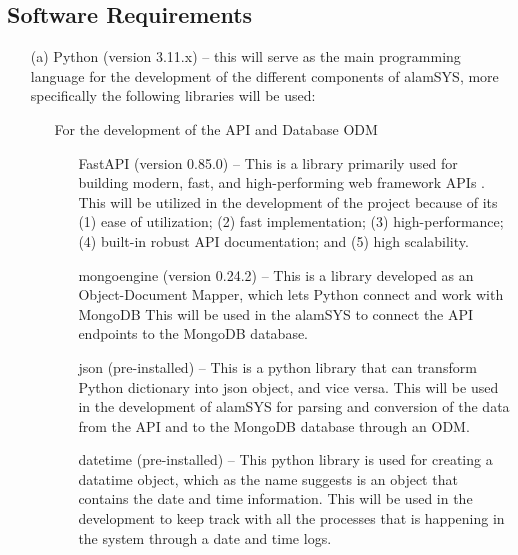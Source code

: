 \subsection{Software Requirements}
\label{sec:software_requirements}
\begin{itemize}
    \item[(a)] Python (version 3.11.x) – this will serve as the main programming 
    language for the development of the different components of alamSYS, more 
    specifically the following libraries will be used:
        \begin{itemize}
            \item[\ding{108}] For the development of the API and Database ODM
                \begin{itemize}
                    \item[\ding{109}] FastAPI (version 0.85.0) – This is a library primarily 
                    used for building modern, fast, and high-performing web framework APIs 
                    \cite{Tiangolo}.
                    This will be utilized in the development of the project because of its 
                    (1) ease of utilization; 
                    (2) fast implementation; 
                    (3) high-performance; 
                    (4) built-in robust API documentation; and 
                    (5) high scalability.
                    \item[\ding{109}] mongoengine (version 0.24.2) – This is a library developed 
                    as an Object-Document Mapper, which lets Python connect and work with MongoDB 
                    \cite{MongoEngine}
                    This will be used in the alamSYS to connect the API endpoints to the 
                    MongoDB database.
                    \item[\ding{109}] json (pre-installed) – This is a python library that 
                    can transform Python dictionary into json object, and vice versa. 
                    This will be used in the development of alamSYS for parsing and conversion of 
                    the data from the API and to the MongoDB database through an ODM.
                    \item[\ding{109}] datetime (pre-installed) – This python library is used for creating 
                    a datatime object, which as the name suggests is an object that contains the date 
                    and time information. This will be used in the development to keep track with all 
                    the processes that is happening in the system through a date and time logs.

\end{itemize}
\end{itemize}
\end{itemize}
